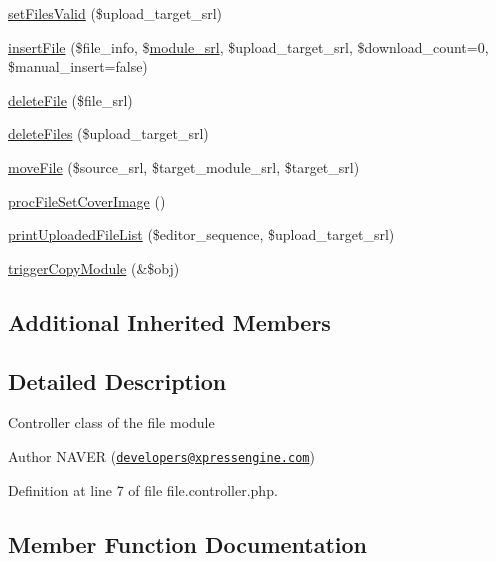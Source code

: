 \begin{DoxyCompactItemize}
\item 
\hyperlink{classfileController_a801efe17bf09b43279f82504b748c5ee}{set\+Files\+Valid} (\$upload\+\_\+target\+\_\+srl)
\item 
\hyperlink{classfileController_aa9247b382342e097dcd71dac7b944c50}{insert\+File} (\$file\+\_\+info, \$\hyperlink{ko_8install_8php_a370bb6450fab1da3e0ed9f484a38b761}{module\+\_\+srl}, \$upload\+\_\+target\+\_\+srl, \$download\+\_\+count=0, \$manual\+\_\+insert=false)
\item 
\hyperlink{classfileController_a98775c010ad21e88fd590c0a35b9c405}{delete\+File} (\$file\+\_\+srl)
\item 
\hyperlink{classfileController_ae3060e078930eeaae0c939d7a1c4f229}{delete\+Files} (\$upload\+\_\+target\+\_\+srl)
\item 
\hyperlink{classfileController_aae914224f7bc02d907004c3fb1dd29ac}{move\+File} (\$source\+\_\+srl, \$target\+\_\+module\+\_\+srl, \$target\+\_\+srl)
\item 
\hyperlink{classfileController_a54e65e695efa22b2a9507fd52e44d601}{proc\+File\+Set\+Cover\+Image} ()
\item 
\hyperlink{classfileController_a99cefbd1c15aeb48b68903e77f9041c7}{print\+Uploaded\+File\+List} (\$editor\+\_\+sequence, \$upload\+\_\+target\+\_\+srl)
\item 
\hyperlink{classfileController_a043759003f14e91db0f4fb554955fba8}{trigger\+Copy\+Module} (\&\$obj)
\end{DoxyCompactItemize}
\subsection*{Additional Inherited Members}


\subsection{Detailed Description}
Controller class of the file module \begin{DoxyAuthor}{Author}
N\+A\+V\+ER (\href{mailto:developers@xpressengine.com}{\tt developers@xpressengine.\+com}) 
\end{DoxyAuthor}


Definition at line 7 of file file.\+controller.\+php.



\subsection{Member Function Documentation}
\mbox{\label{classfileController_a98775c010ad21e88fd590c0a35b9c405}} 
